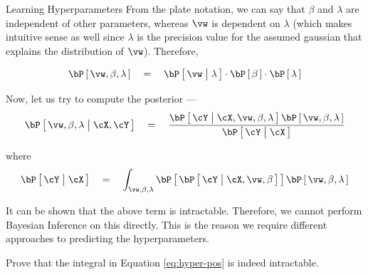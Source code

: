 \documentclass{article}
\begin{document}
\begin{ssection}[1]{Learning Hyperparameters}
	From the plate notation, we can say that $\beta$ and $\lambda$ are independent of other parameters, whereas $\vw$ is dependent on $\lambda$ (which makes intuitive sense as well since $\lambda$ is the precision value for the assumed gaussian that explains the distribution of $\vw$). Therefore,

	\begin{align*}
		\prob{\vw, \beta, \lambda}	\eq	\prob{\vw \pipe \lambda} \cdot \prob{\beta} \cdot \prob{\lambda}
	\end{align*}

	Now, let us try to compute the posterior ---
	\begin{align*}
		\prob{\vw, \beta, \lambda \pipe \cX, \cY}	\eq	\frac{\prob{\cY \pipe \cX, \vw, \beta, \lambda} \prob{\vw, \beta, \lambda}}{\prob{\cY \pipe \cX}}
	\end{align*}

	where
	\begin{equation}
		\prob{\cY \pipe \cX}	\eq	\int_{\vw, \beta, \lambda}	\prob{\prob{\cY \pipe \cX, \vw, \beta}} \prob{\vw, \beta, \lambda}
		\label{eq:hyper-pos}
	\end{equation}

	It can be shown that the above term is intractable. Therefore, we cannot perform Bayesian Inference on this directly. This is the reason we require different approaches to predicting the hyperparameters.

	\begin{exercise}
		Prove that the integral in Equation \ref{eq:hyper-pos} is indeed intractable.
	\end{exercise}


\end{ssection}
\end{document}
